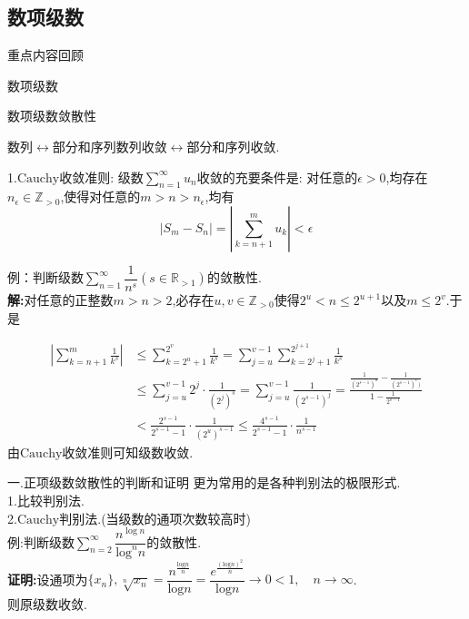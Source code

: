 \documentclass[UTF8]{ctexbeamer}
\begin{document}
    \subsection{数项级数}
    \begin{frame}
        \begin{block}{\begin{center}重点内容回顾\end{center}}
            \begin{center}
                \Huge{数项级数}
            \end{center}
        \end{block}
    \end{frame}
    \begin{frame}{数项级数敛散性}
        \begin{center}
            数列$\longleftrightarrow$部分和序列\quad 数列收敛$\longleftrightarrow $部分和序列收敛.
        \end{center}
            1.$\mathrm{Cauchy}$收敛准则:
            级数$\sum\limits_{n=1}^{\infty}u_n$收敛的充要条件是:
            对任意的$\epsilon> 0$,均存在$n_\epsilon \in \mathbb{Z}_{> 0}$,使得对任意的$m> n> n_{\epsilon}$,均有
            \[\mid S_m-S_n\mid=\left|\sum_{k=n+1}^{m}u_k\right|<\epsilon\]
    \end{frame}
    \begin{frame}
        例：判断级数$\sum\limits_{n=1}^{\infty}\dfrac{1}{n^s}\left(s\in\mathbb{R}_{>1} \right)$的敛散性.
        \pause
        \\\textbf{解:}对任意的正整数$m>n>2$,必存在$u,v\in\mathbb{Z}_{>0}$使得$2^u<n\leqslant2^{u+1}$以及$m\leqslant2^v$.于是
        
            \[\begin{aligned}
                \left|\sum_{k=n+1}^{m}\frac{1}{k^s}\right|&\leqslant\sum_{k=2^u+1}^{2^v}\frac{1}{k^s}=\sum_{j=u}^{v-1}\sum_{k=2^j+1}^{2^{j+1}}\frac{1}{k^s}\\
                &\leqslant\sum_{j=u}^{v-1}2^j\cdot \frac{1}{(2^j)^s}=\sum_{j=u}^{v-1}\frac{1}{(2^{s-1})^j}=\frac{\frac{1}{(2^{s-1})^u}-\frac{1}{(2^{s-1})^v)}}{1-\frac{1}{2^{s-1}}}\\
                &<\frac{2^{s-1}}{2^{s-1}-1}\cdot\frac{1}{(2^u)^{s-1}}\leqslant\frac{4^{s-1}}{2^{s-1}-1}\cdot\frac{1}{n^{s-1}}
            \end{aligned}\]
            由$\mathrm{Cauchy}$收敛准则可知级数收敛.
    \end{frame}
    \begin{frame}{一.正项级数敛散性的判断和证明}
        更为常用的是各种判别法的极限形式.
        \\1.比较判别法.
        \\2.$\mathrm{Cauchy}$判别法.(当级数的通项次数较高时)
        \\例:判断级数$\sum\limits_{n=2}^{\infty}\dfrac{n^{\log n}}{\mathrm{log}^nn}$的敛散性.
        \pause
        \\\textbf{证明:}设通项为$\{x_n\},\sqrt[n]{x_n}=\dfrac{n^{\frac{\mathrm{log}n}{n}}}{\mathrm{log}n}=\dfrac{e^{\frac{(\mathrm{log}n)^2}{n}}}{\mathrm{log}n}\longrightarrow 0<1,\quad n\longrightarrow \infty$.
        \\则原级数收敛.
    \end{frame}
\end{document}
